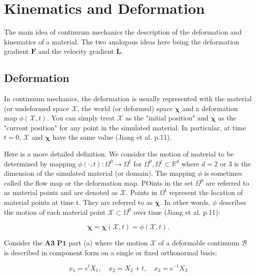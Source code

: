 \documentclass[a4paper]{article}
\begin{document}
\section{Kinematics and Deformation}

The main idea of continuum mechanics the description of the deformation and kinematics of a material. The two analogous ideas here being the deformation gradient $\mathbf{F}$ and the velocity gradient $\mathbf{L}$.

\subsection{Deformation}
In continuum mechanics, the deformation is usually represented with the material (or undeformed space $\boldsymbol{\mathcal{X}}$, the world (or deformed) space $\boldsymbol{\chi}$ and a deformation map $\phi(\boldsymbol{\mathcal{X}},t)$. You can simply treat $\boldsymbol{\mathcal{X}}$ as the "initial position" and $\boldsymbol{\chi}$ as the "current position" for any point in the simulated material. In particular, at time $t=0$, $\boldsymbol{\mathcal{X}}$ and $\boldsymbol{\chi}$ have the same value (Jiang et al. p.11). 

Here is a more detailed definition. We consider the motion of material to be determined by mapping $\phi (\cdot, t): \Omega^0 \xrightarrow{} \Omega^t$ for $\Omega^0, \Omega^t \subset \mathbb{R}^d$ where $d = 2$ or $3$ is the dimension of the simulated material (or domain). The mapping $\phi$ is sometimes called the flow map or the deformation map. POints in the set $\Omega^0$ are referred to as material points and are denoted as $\boldsymbol{\mathcal{X}}$. Points in $\Omega^t$ represent the location of material points at time t. They are referred to as $\boldsymbol{\chi}$. In other words, $\phi$ describes the motion of each material point $\boldsymbol{\mathcal{X}} \subset \Omega^0$ over time (Jiang et al. p.11):

\begin{equation}\label{eq:1}
    \boldsymbol{\chi} = \boldsymbol{\chi}(\boldsymbol{\mathcal{X}}, t) = \phi(\boldsymbol{\mathcal{X}},t).
\end{equation}

Consider the $\mathbf{A3}$ $\mathbf{P1}$ part (a) where the motion $\boldsymbol{\mathcal{X}}$ of a deformable continuum $\mathcal{B}$ is described in component form on a single or fixed orthonormal basis: 

\begin{equation}\label{eq:2}
    x_1 = e^tX_1, \quad x_2 = X_2 + t, \quad x_3 = e^{-t}X_3
\end{equation}
\end{document}
